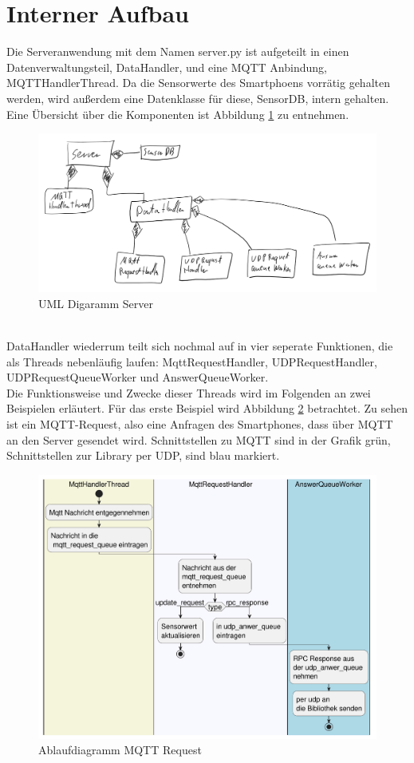 \documentclass[11pt,a4paper]{report}
\begin{document}
\section{Interner Aufbau}
Die Serveranwendung mit dem Namen server.py ist aufgeteilt in einen Datenverwaltungsteil, DataHandler, und eine MQTT Anbindung, MQTTHandlerThread.
Da die Sensorwerte des Smartphoens vorrätig gehalten werden, wird außerdem eine Datenklasse für diese, SensorDB, intern gehalten.
Eine Übersicht über die Komponenten ist Abbildung \ref{fig:serverUml} zu entnehmen.
\begin{figure}[htbp]
  \centering
  \includegraphics[width=.8\textwidth]{images/ServerUml.png}
  \caption{UML Digaramm Server}
  \label{fig:serverUml}
\end{figure}
\\
DataHandler wiederrum teilt sich nochmal auf in vier seperate Funktionen, die als Threads nebenläufig laufen: MqttRequestHandler, UDPRequestHandler, UDPRequestQueueWorker und AnswerQueueWorker.
\\
Die Funktionsweise und Zwecke dieser Threads wird im Folgenden an zwei Beispielen erläutert.
Für das erste Beispiel wird Abbildung \ref{fig:serverMqttReqPath} betrachtet.
Zu sehen ist ein MQTT-Request, also eine Anfragen des Smartphones, dass über MQTT an den Server gesendet wird.
Schnittstellen zu MQTT sind in der Grafik grün, Schnittstellen zur Library per UDP, sind blau markiert.
\begin{figure}[htbp]
  \centering
  \includegraphics[width=.8\textwidth]{images/MqttRequestServerPath}
  \caption{Ablaufdiagramm MQTT Request}
  \label{fig:serverMqttReqPath}
\end{figure}
\end{document}
